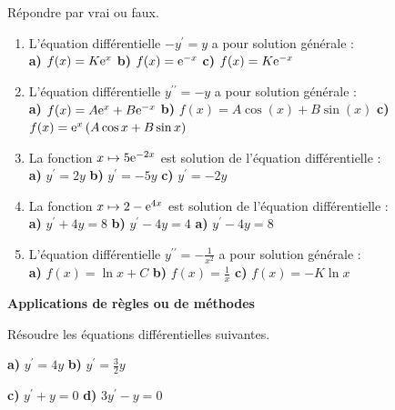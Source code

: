 \begin{exercice} 
Répondre par vrai ou faux.
 \begin{enumerate}
  \item L'équation différentielle $-y^{\prime}= y $ a pour solution générale :\\
  \textbf{a)}\; $ f(x)=K\mathrm{e}^{x} $\hspace*{3cm} \textbf{b)}\; $ f(x)=\mathrm{e}^{-x} $\hspace*{3cm} \textbf{c)}\; $ f(x)=K\mathrm{e}^{-x} $
    \item L'équation différentielle $y^{\prime\prime}= -y $ a pour solution générale :\\
  \textbf{a)}\; $ f(x)=A\mathrm{e}^{x}+ B\mathrm{e}^{-x}$\hspace*{1cm} \textbf{b)}\; $ f(x)=A\cos(x)+B\sin(x) $\hspace*{1cm} \textbf{c)}\; $ f(x)=\mathrm{e}^{x} \left(A\cos x+B\sin x\right)$
  \item La fonction  $x\mapsto 5\mathrm{e}^{-2x} $ est solution de l'équation         différentielle :\\
  \textbf{a)}\; $ y^{\prime}= 2y$\hspace*{1cm} \textbf{b)}\; $ y^{\prime}= -5y $\hspace*{1cm} \textbf{c)}\; $ y^{\prime}= -2y$

  \item La fonction $x\mapsto 2-\mathrm{e}^{4x}$ est solution de l’équation différentielle :\\
  \textbf{a)}\; $ y^{\prime} +4y =8$\hspace*{2cm} \textbf{b)}\; $ y^{\prime} -4y =4$ \hspace*{2cm} \textbf{a)}\; $ y^{\prime} -4y =8$
      \item L'équation différentielle $y^{\prime\prime}= -\tfrac{1}{x^2} $ a pour solution générale :\\
  \textbf{a)}\; $ f(x)=\ln x+C$\hspace*{1cm} \textbf{b)}\; $ f(x)=\tfrac{1}{x} $\hspace*{1cm} \textbf{c)}\; $ f(x)=-K\ln x$
   \end{enumerate}
\end{exercice}
\bigskip

\textbf{Applications de règles ou de méthodes}
 \begin{exercice} 
Résoudre les équations différentielles suivantes.

\textbf{a)}\; $ y^{\prime}=4y $\hspace*{3cm}
\textbf{b)}\; $ y^{\prime}=\frac{3}{2}y $

\textbf{c)}\; $ y^{\prime}+y=0 $\hspace*{3cm}
\textbf{d)}\; $ 3y^{\prime}-y =0$

\end{exercice}

